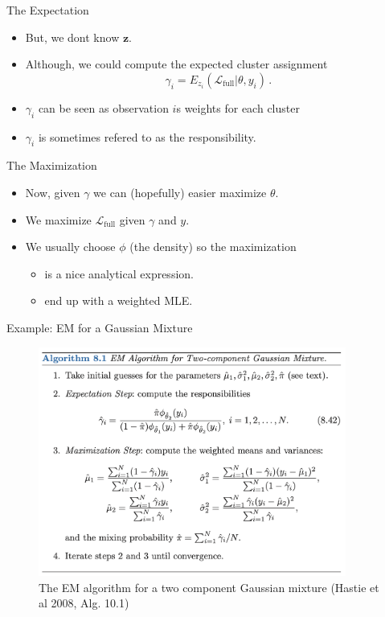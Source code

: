 \documentclass[10pt]{beamer}
\begin{document}
\begin{frame}{The Expectation}

\begin{itemize}
\item But, we dont know $\mathbf{z}$.\pause
\item Although, we could compute the {\color{uured} expected} cluster assignment
\[
\gamma_{i} = E_{z_i} (\mathcal{L}_{\text{full}}|\theta, y_i)\,.
\]
\pause
\item $\gamma_{i}$ can be seen as observation $i$s {\color{uured} weights} for each cluster
\pause
\item $\gamma_{i}$ is sometimes refered to as the {\color{uured} responsibility}.
\end{itemize}

\end{frame}


\begin{frame}{The Maximization}

\begin{itemize}
\item Now, given $\gamma$ we can (hopefully) easier maximize $\theta$.\pause
\item We maximize $\mathcal{L}_{\text{full}}$ given $\gamma$ and $y$.\pause
\item We usually choose $\phi$ (the density) so the maximization
\begin{itemize}
\item is a nice analytical expression.
\item end up with a weighted MLE.
\end{itemize}

\end{itemize}



\end{frame}

\begin{frame}{Example: EM for a Gaussian Mixture}

\begin{figure}[h]
\centering
\includegraphics[width=0.9\textwidth]{fig/algo_8_1_em_gaussian.png}
\caption{The EM algorithm for a two component Gaussian mixture (Hastie et al 2008, Alg. 10.1)}
\end{figure}

\end{frame}
\end{document}
